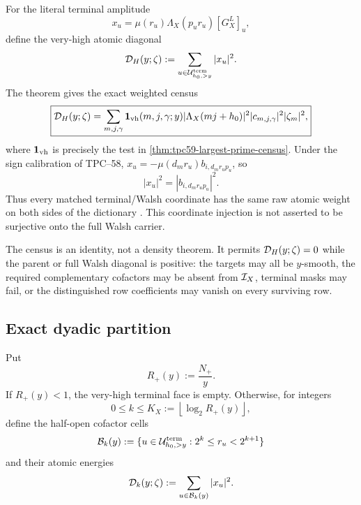 For the literal terminal amplitude
\begin{equation}
 x_u=\mu(r_u)\Lambda_X(p_ur_u)[G_X^L]_u,
 \label{eq:tpc59-literal-terminal-amplitude-repeat}
\end{equation}
define the very-high atomic diagonal
\begin{equation}
 \mathcal D_H(y;\zeta)
 :=\sum_{u\in\mathcal U_{h_0,>y}^{\rm term}}|x_u|^2.
 \label{eq:tpc59-very-high-terminal-diagonal}
\end{equation}
The theorem gives the exact weighted census
\begin{equation}
 \boxed{
 \mathcal D_H(y;\zeta)
 =\sum_{m,j,\gamma}
   \mathbf 1_{\rm vh}(m,j,\gamma;y)
   |\Lambda_X(mj+h_0)|^2
   |c_{m,j,\gamma}|^2|\zeta_m|^2,}
 \label{eq:tpc59-largest-prime-energy-census}
\end{equation}
where \(\mathbf 1_{\rm vh}\) is precisely the test in
\cref{thm:tpc59-largest-prime-census}.  Under the sign calibration of
TPC--58, \(x_u=-\mu(d_mr_u)b_{i,d_mr_up_u}\), so
\begin{equation}
 |x_u|^2=|b_{i,d_mr_up_u}|^2.
 \label{eq:tpc59-terminal-Walsh-atomic-match}
\end{equation}
Thus every matched terminal/Walsh coordinate has the same raw atomic
weight on both sides of the dictionary \citep{WangTPC58}.  This coordinate
injection is not asserted to be surjective onto the full Walsh carrier.

The census is an identity, not a density theorem.  It permits
\(\mathcal D_H(y;\zeta)=0\) while the parent or full Walsh diagonal is positive:
the targets may all be \(y\)-smooth, the required complementary cofactors
may be absent from \(\mathcal I_X\), terminal masks may fail, or the distinguished
row coefficients may vanish on every surviving row.

\subsection{Exact dyadic partition}

Put
\begin{equation}
 R_+(y):=\frac{N_+}{y}.
 \label{eq:tpc59-dyadic-R-plus}
\end{equation}
If \(R_+(y)<1\), the very-high terminal face is empty.  Otherwise, for
integers
\begin{equation}
 0\le k\le K_X:=\left\lfloor\log_2R_+(y)\right\rfloor,
 \label{eq:tpc59-dyadic-index-range}
\end{equation}
define the half-open cofactor cells
\begin{equation}
 \mathcal B_k(y)
 :=\{u\in\mathcal U_{h_0,>y}^{\rm term}:2^k\le r_u<2^{k+1}\}
 \label{eq:tpc59-dyadic-terminal-cells}
\end{equation}
and their atomic energies
\begin{equation}
 \mathcal D_k(y;\zeta):=\sum_{u\in\mathcal B_k(y)}|x_u|^2.
 \label{eq:tpc59-dyadic-terminal-energy}
\end{equation}

